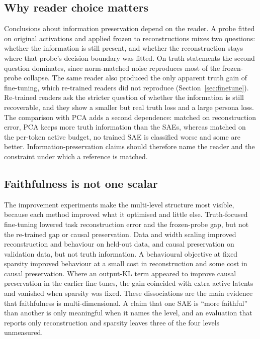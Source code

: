 \subsection{Why reader choice matters}\label{sec:disc-readers}

Conclusions about information preservation depend on the reader. A probe fitted on original activations and applied
frozen to reconstructions mixes two questions: whether the information is still present, and whether the reconstruction
stays where that probe's decision boundary was fitted. On truth statements the second question dominates, since
norm-matched noise reproduces most of the frozen-probe collapse. The same reader also produced the only apparent truth
gain of fine-tuning, which re-trained readers did not reproduce (Section~\ref{sec:finetune}). Re-trained readers ask
the stricter question of whether the information is still recoverable, and they show a smaller but real truth loss and
a large persona loss. The comparison with PCA adds a second dependence: matched on reconstruction error, PCA keeps more
truth information than the SAEs, whereas matched on the per-token active budget, no trained SAE is classified worse and
some are better. Information-preservation claims should therefore name the reader and the constraint under which a
reference is matched.

\subsection{Faithfulness is not one scalar}\label{sec:disc-scalar}

The improvement experiments make the multi-level structure most visible, because each method improved what it
optimised and little else. Truth-focused fine-tuning lowered task reconstruction error and the frozen-probe gap, but not
the re-trained gap or causal preservation. Data and width scaling improved reconstruction and behaviour on held-out
data, and causal preservation on validation data, but not truth information. A behavioural objective at fixed sparsity
improved behaviour at a small cost in reconstruction and some cost in causal preservation. Where an output-KL term
appeared to improve causal preservation in the earlier fine-tunes, the gain coincided with extra active latents and
vanished when sparsity was fixed. These dissociations are the main evidence that faithfulness is multi-dimensional. A
claim that one SAE is ``more faithful'' than another is only meaningful when it names the level, and an evaluation that
reports only reconstruction and sparsity leaves three of the four levels unmeasured.

